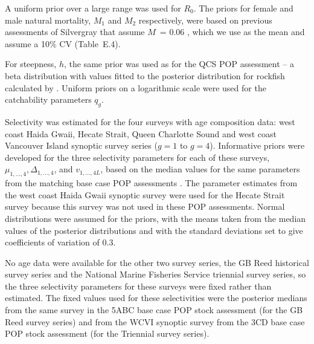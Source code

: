 \documentclass[11pt]{article}   %
\def\AppLet{E}                   %
\newcommand{\popQCS}{Edwards-etal:2012pop}
\newcommand{\popWCVI}{Edwards-etal:20133CD}
\newcommand{\popWCHG}{Edwards-etal:20135DE}
\begin{document}

A uniform prior over a large range was used for $R_0$. 
The priors for female and male natural mortality, $M_1$ and $M_2$ respectively, were based on previous assessments of Silvergray that assume $M$~= 0.06 \citep{Stanley-Kronlund:2000, Stanley-Olsen:2002}, which we use as the mean and assume a 10\% CV (Table~\AppLet.4).

For steepness, $h$, the same prior was used as for the QCS POP assessment \citep{\popQCS} -- a beta distribution with values fitted to the posterior distribution for rockfish calculated by \citet{fmdms10}. Uniform priors on a logarithmic scale were used for the catchability parameters $q_g$. 

Selectivity was estimated for the  four surveys with age composition data: west coast Haida Gwaii, Hecate Strait, Queen Charlotte Sound and west coast Vancouver Island synoptic survey series ($g=1$ to $g=4$). Informative priors were developed for the three selectivity parameters for each of these surveys, $\mu_{1,...,4}, \Delta_{1,...,4}$, and $v_{1,...,4L}$, based on the median values for the same parameters from the matching base case POP assessments \citep{\popQCS, \popWCVI, \popWCHG}. The parameter estimates from the west coast Haida Gwaii synoptic survey were used for the Hecate Strait survey because this survey was not used in these POP assessments. Normal distributions were assumed for the priors, with the means taken from the median values of the posterior distributions and with the standard deviations set to give coefficients of variation of 0.3. 

No age data were available for the other two survey series, the GB Reed historical survey series and the National Marine Fisheries Service triennial survey series, so the three selectivity parameters for these surveys were fixed rather than estimated. The fixed values used for these selectivities were the posterior medians from the same survey in the 5ABC base case POP stock assessment (for the GB Reed survey series) and from the WCVI synoptic survey from the 3CD base case POP stock assessment (for the Triennial survey series).
\end{document}
